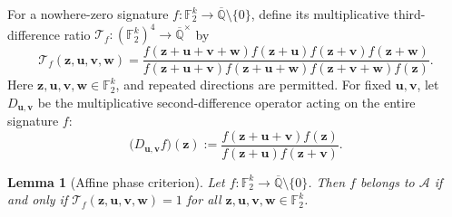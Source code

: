 \documentclass[11pt,letterpaper,onecolumn]{article}
\theoremstyle{plain}
\newtheorem{lemma}[lemma]{Lemma}
\theoremstyle{definition}
\theoremstyle{remark}
\newcommand{\AlgNums}{\overline{\mathbb Q}}
\newcommand{\Ftwo}{\mathbb F_2}
\newcommand{\cA}{\mathscr A}
\begin{document}
For a nowhere-zero signature \(f:\Ftwo^k\to\AlgNums\setminus\{0\}\), define
its multiplicative third-difference ratio
\(\mathcal T_f:(\Ftwo^k)^4\to\AlgNums^\times\) by
\begin{equation*}
 \mathcal T_f({\mathbf{z}},{\mathbf{u}},{\mathbf{v}},{\mathbf{w}})=
 \frac{f({\mathbf{z}}+{\mathbf{u}}+{\mathbf{v}}+{\mathbf{w}})f({\mathbf{z}}+{\mathbf{u}})f({\mathbf{z}}+{\mathbf{v}})f({\mathbf{z}}+{\mathbf{w}})}
 {f({\mathbf{z}}+{\mathbf{u}}+{\mathbf{v}})f({\mathbf{z}}+{\mathbf{u}}+{\mathbf{w}})f({\mathbf{z}}+{\mathbf{v}}+{\mathbf{w}})f({\mathbf{z}})}.
\end{equation*}
Here \({\mathbf{z}},{\mathbf{u}},{\mathbf{v}},{\mathbf{w}}\in\Ftwo^k\), and repeated directions are permitted.
For fixed \({\mathbf{u}},{\mathbf{v}}\), let \(D_{{\mathbf{u}},{\mathbf{v}}}\) be the multiplicative
second-difference operator acting on the entire signature \(f\):
\begin{equation*}
 \bigl(D_{{\mathbf{u}},{\mathbf{v}}}f\bigr)({\mathbf{z}})
 :=
 \frac{f({\mathbf{z}}+{\mathbf{u}}+{\mathbf{v}})f({\mathbf{z}})}
      {f({\mathbf{z}}+{\mathbf{u}})f({\mathbf{z}}+{\mathbf{v}})}.
\end{equation*}

\begin{lemma}[Affine phase criterion]
\label{lem:affine-phase-criterion}
Let \(f:\Ftwo^k\to\AlgNums\setminus\{0\}\).  Then \(f\) belongs to
\(\cA\) if and only if
\(\mathcal T_f({\mathbf{z}},{\mathbf{u}},{\mathbf{v}},{\mathbf{w}})=1\) for all \({\mathbf{z}},{\mathbf{u}},{\mathbf{v}},{\mathbf{w}}\in\Ftwo^k\).
\end{lemma}
\end{document}
